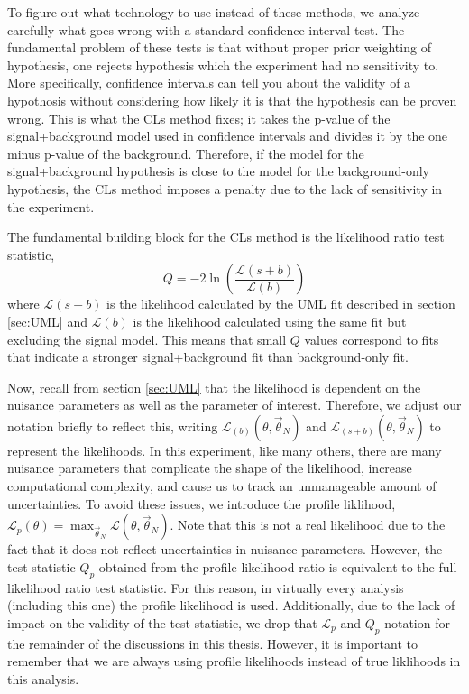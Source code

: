 To figure out what technology to use instead of these methods, we analyze carefully what goes wrong with a standard confidence interval test. The fundamental problem of these tests is that without proper prior weighting of hypothesis, one rejects hypothesis which the experiment had no sensitivity to. More specifically, confidence intervals can tell you about the validity of a hypothosis without considering how likely it is that the hypothesis can be proven wrong. This is what the CLs method fixes; it takes the p-value of the signal+background model used in confidence intervals and divides it by the one minus p-value of the background. Therefore, if the model for the signal+background hypothesis is close to the model for the background-only hypothesis, the CLs method imposes a penalty due to the lack of sensitivity in the experiment. 

The fundamental building block for the CLs method is the likelihood ratio test statistic, 
\begin{equation}
    Q = -2 \ln \left(\frac{\mathcal{L}(s+b)}{\mathcal{L}(b)}\right)
\end{equation}
where $\mathcal{L}(s+b)$ is the likelihood calculated by the UML fit described in section \ref{sec:UML} and $\mathcal{L}(b)$ is the likelihood calculated using the same fit but excluding the signal model. This means that small $Q$ values correspond to fits that indicate a stronger signal+background fit than background-only fit. 

Now, recall from section \ref{sec:UML} that the likelihood is dependent on the nuisance parameters as well as the parameter of interest. Therefore, we adjust our notation briefly to reflect this, writing $\mathcal{L}_{(b)}(\theta, \vec{\theta}_N)$ and $\mathcal{L}_{(s+b)}(\theta, \vec{\theta}_N)$ to represent the likelihoods. In this experiment, like many others, there are many nuisance parameters that complicate the shape of the likelihood, increase computational complexity, and cause us to track an unmanageable amount of uncertainties. To avoid these issues, we introduce the profile liklihood, $\mathcal{L}_p(\theta) = \max_{\vec{\theta}_N} \mathcal{L}(\theta, \vec{\theta}_N)$. Note that this is not a real likelihood due to the fact that it does not reflect uncertainties in nuisance parameters. However, the test statistic $Q_p$ obtained from the profile likelihood ratio is equivalent to the full likelihood ratio test statistic. For this reason, in virtually every analysis (including this one) the profile likelihood is used. Additionally, due to the lack of impact on the validity of the test statistic, we drop that $\mathcal{L}_p$ and $Q_p$ notation for the remainder of the discussions in this thesis. However, it is important to remember that we are always using profile likelihoods instead of true liklihoods in this analysis. 

